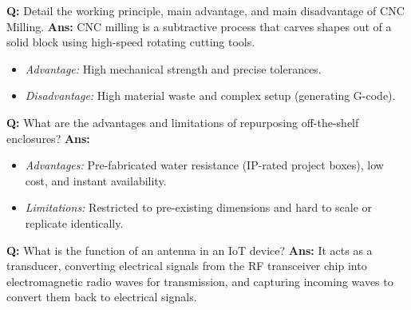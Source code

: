 \documentclass[10pt,a4paper,twocolumn]{article}
\begin{document}
\begin{tcolorbox}[
  colback=white,
  colframe=UnitColorFive,
  colbacktitle=gray!10!white,
  coltitle=black,
  fonttitle=\bfseries\sffamily\small,
  title={Unit V $\bullet$ Card 5},
  boxrule=1.2pt,
  arc=2mm,
  outer arc=2mm,
  boxsep=1.5mm,
  top=1mm,
  bottom=1mm,
  left=1.5mm,
  right=1.5mm,
  before skip=2.5mm,
  after skip=2.5mm
]
\textbf{Q:} Detail the working principle, main advantage, and main disadvantage of CNC Milling.
\tcbline
\textbf{Ans:} CNC milling is a subtractive process that carves shapes out of a solid block using high-speed rotating cutting tools.  
\begin{itemize}
  \item \textit{Advantage:} High mechanical strength and precise tolerances.
  \item \textit{Disadvantage:} High material waste and complex setup (generating G-code).
\end{itemize}
\end{tcolorbox}


\begin{tcolorbox}[
  colback=white,
  colframe=UnitColorFive,
  colbacktitle=gray!10!white,
  coltitle=black,
  fonttitle=\bfseries\sffamily\small,
  title={Unit V $\bullet$ Card 6},
  boxrule=1.2pt,
  arc=2mm,
  outer arc=2mm,
  boxsep=1.5mm,
  top=1mm,
  bottom=1mm,
  left=1.5mm,
  right=1.5mm,
  before skip=2.5mm,
  after skip=2.5mm
]
\textbf{Q:} What are the advantages and limitations of repurposing off-the-shelf enclosures?
\tcbline
\textbf{Ans:} \begin{itemize}
  \item \textit{Advantages:} Pre-fabricated water resistance (IP-rated project boxes), low cost, and instant availability.
  \item \textit{Limitations:} Restricted to pre-existing dimensions and hard to scale or replicate identically.
\end{itemize}
\end{tcolorbox}


\begin{tcolorbox}[
  colback=white,
  colframe=UnitColorFive,
  colbacktitle=gray!10!white,
  coltitle=black,
  fonttitle=\bfseries\sffamily\small,
  title={Unit V $\bullet$ Card 7},
  boxrule=1.2pt,
  arc=2mm,
  outer arc=2mm,
  boxsep=1.5mm,
  top=1mm,
  bottom=1mm,
  left=1.5mm,
  right=1.5mm,
  before skip=2.5mm,
  after skip=2.5mm
]
\textbf{Q:} What is the function of an antenna in an IoT device?
\tcbline
\textbf{Ans:} It acts as a transducer, converting electrical signals from the RF transceiver chip into electromagnetic radio waves for transmission, and capturing incoming waves to convert them back to electrical signals.
\end{tcolorbox}
\end{document}

